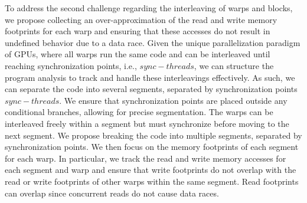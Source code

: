 To address the second challenge regarding the interleaving of warps and blocks, we propose collecting an over-approximation of the read and write memory footprints for each warp and ensuring that these accesses do not result in undefined behavior due to a data race.
%
Given the unique parallelization paradigm of GPUs, where all warps run the same code and can be interleaved until reaching synchronization points, i.e., $\mathit{sync-threads}$, we can structure the program analysis to track and handle these interleavings effectively.
As such, we can separate the code into several segments, separated by synchronization points $\mathit{sync-threads}$. 
%
We ensure that synchronization points are placed outside any conditional branches, allowing for precise segmentation.
%
The warps can be interleaved freely within a segment but must synchronize before moving to the next segment.
We propose breaking the code into multiple segments, separated by synchronization points.
%
We then focus on the memory footprints of each segment for each warp. 
%
In particular, we track the read and write memory accesses for each segment and warp and ensure that write footprints do not overlap with the read or write footprints of other warps within the same segment. 
%
Read footprints can overlap since concurrent reads do not cause data races.
%


%

%
%
%
%
%
%
%


